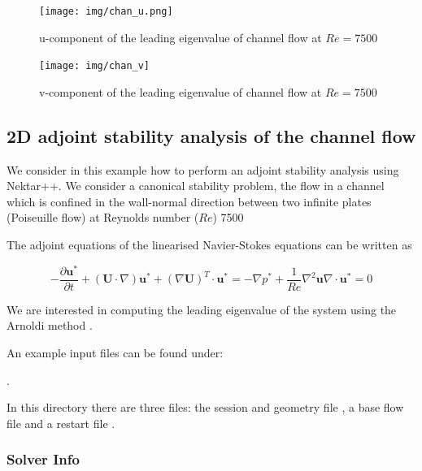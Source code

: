 \begin{figure}[!htbp]
\centering
 {\texttt{[image: img/chan\_u.png]}}
  \caption {u-component of the leading eigenvalue of channel flow at $Re=7500$}
\end{figure}

\begin{figure}[!htbp]
\centering
 {\texttt{[image: img/chan\_v]}}
  \caption {v-component of the leading eigenvalue of channel flow at $Re=7500$}
\end{figure}

\clearpage
\subsection{2D adjoint stability analysis of the channel flow}

We consider in this example how to perform an adjoint stability
analysis using Nektar++. We consider a canonical stability problem,
the flow in a channel which is confined in the wall-normal direction
between two infinite plates (Poiseuille flow) at Reynolds number ($Re$) 7500

The adjoint equations of the linearised Navier-Stokes equations can be
written as

  \begin{subequations}
  \begin{equation}
  -\frac{\partial \mathbf{u}^*}{\partial t}+(\mathbf{U} \cdot \nabla)\mathbf{u}^*+(\nabla \mathbf{U})^T \cdot \mathbf{u}^*=-\nabla p^*+\frac{1}{Re} \nabla^2 \mathbf{u}
  \end{equation}

  \begin{equation}
  \nabla \cdot \mathbf{u}^*=0
  \end{equation}
  \end{subequations}

We are interested in computing the leading eigenvalue of the system
using the Arnoldi method \cite{BiGlobal}.

An example input files can be found under:

.

In this directory there are three files: the session and geometry file
, a base flow file
 and a restart file
.


\subsubsection*{Solver Info}

